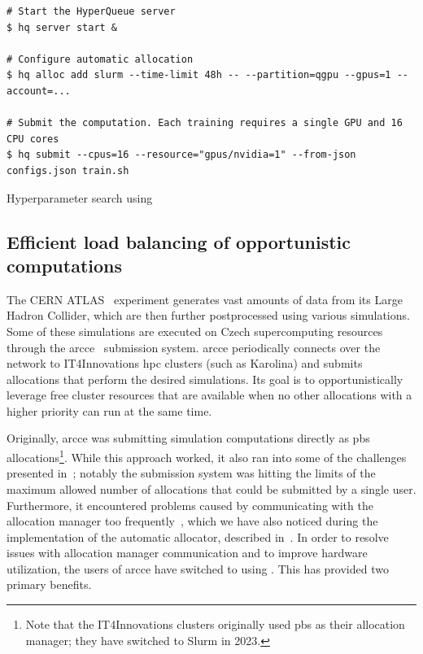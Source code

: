 \begin{listing}[h]
	\begin{verbatim}
# Start the HyperQueue server
$ hq server start &

# Configure automatic allocation
$ hq alloc add slurm --time-limit 48h -- --partition=qgpu --gpus=1 --account=...

# Submit the computation. Each training requires a single GPU and 16 CPU cores
$ hq submit --cpus=16 --resource="gpus/nvidia=1" --from-json configs.json train.sh
	\end{verbatim}
	\caption{Hyperparameter search using \hyperqueue{}}
	\label{lst:hq-exa4mind-hyperparameter-search}
\end{listing}

\subsection{Efficient load balancing of opportunistic computations}
The CERN ATLAS~\cite{atlas} experiment generates vast amounts of data from its Large
Hadron Collider, which are then further postprocessed using various simulations. Some of these
simulations are executed on Czech supercomputing resources through the
\gls{arcce}~\cite{atlas-it4i-1} submission system. \gls{arcce}
periodically connects over the network to IT4Innovations \gls{hpc} clusters (such as
Karolina) and submits allocations that perform the desired simulations. Its goal is to
opportunistically leverage free cluster resources that are available when no other allocations with
a higher priority can run at the same time.

Originally, \gls{arcce} was submitting simulation computations directly as
\gls{pbs} allocations\footnote{Note that the IT4Innovations clusters originally used \gls{pbs} as their allocation
manager; they have switched to Slurm in 2023.}. While this approach worked, it also ran
into some of the challenges presented in~; notably the submission system was
hitting the limits of the maximum allowed number of allocations that could be submitted by a single
user. Furthermore, it encountered problems caused by communicating with the allocation manager too
frequently~\cite{atlas-it4i-2}, which we have also noticed during the implementation of the
\hyperqueue{} automatic allocator, described in~. In order to
resolve issues with allocation manager communication and to improve hardware utilization, the users
of \gls{arcce} have switched to using \hyperqueue{}. This has provided two
primary benefits.

